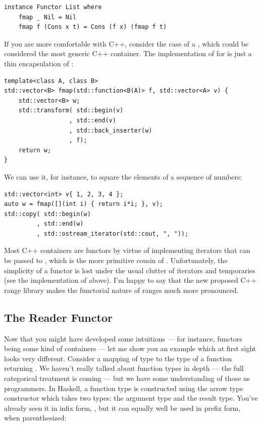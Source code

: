 \begin{verbatim}
instance Functor List where
    fmap _ Nil = Nil
    fmap f (Cons x t) = Cons (f x) (fmap f t)
\end{verbatim}
If you are more comfortable with C++, consider the case of a
, which could be considered the most generic C++
container. The implementation of  for 
is just a thin encapsulation of :

\begin{verbatim}
template<class A, class B>
std::vector<B> fmap(std::function<B(A)> f, std::vector<A> v) {
    std::vector<B> w;
    std::transform( std::begin(v)
                  , std::end(v)
                  , std::back_inserter(w)
                  , f); 
    return w;
}
\end{verbatim}
We can use it, for instance, to square the elements of a sequence of
numbers:

\begin{verbatim}
std::vector<int> v{ 1, 2, 3, 4 };
auto w = fmap([](int i) { return i*i; }, v);
std::copy( std::begin(w)
         , std::end(w)
         , std::ostream_iterator(std::cout, ", "));
\end{verbatim}
Most C++ containers are functors by virtue of implementing iterators
that can be passed to , which is the more
primitive cousin of . Unfortunately, the simplicity of a
functor is lost under the usual clutter of iterators and temporaries
(see the implementation of  above). I'm happy to say that
the new proposed C++ range library makes the functorial nature of ranges
much more pronounced.

\subsection{The Reader Functor}\label{the-reader-functor}

Now that you might have developed some intuitions --- for instance,
functors being some kind of containers --- let me show you an example
which at first sight looks very different. Consider a mapping of type
 to the type of a function returning . We haven't
really talked about function types in depth --- the full categorical
treatment is coming --- but we have some understanding of those as
programmers. In Haskell, a function type is constructed using the arrow
type constructor \code{(->)} which takes two types: the
argument type and the result type. You've already seen it in infix form,
, but it can equally well be used in prefix
form, when parenthesized:

